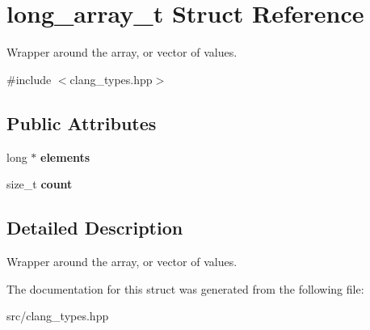 \hypertarget{structlong__array__t}{}\section{long\+\_\+array\+\_\+t Struct Reference}
\label{structlong__array__t}


Wrapper around the array, or vector of values.  




{\ttfamily \#include $<$clang\+\_\+types.\+hpp$>$}

\subsection*{Public Attributes}
\begin{DoxyCompactItemize}
\item 
\mbox{\label{structlong__array__t_a724b90b7d64294a1d08a3f965beba1c2}} 
long $\ast$ {\bfseries elements}
\item 
\mbox{\label{structlong__array__t_a27537b9d8af842fbf1c3432af3e03ebd}} 
size\+\_\+t {\bfseries count}
\end{DoxyCompactItemize}


\subsection{Detailed Description}
Wrapper around the array, or vector of values. 

The documentation for this struct was generated from the following file\+:\begin{DoxyCompactItemize}
\item 
src/clang\+\_\+types.\+hpp\end{DoxyCompactItemize}
